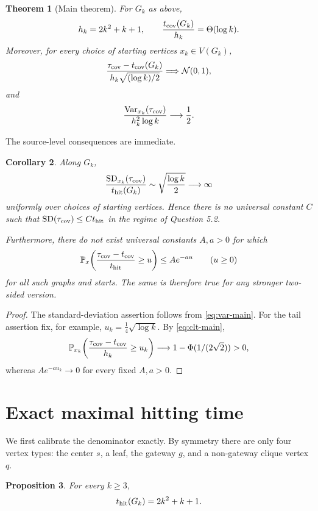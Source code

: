 \documentclass[11pt]{article}
\newtheorem{theorem}{Theorem}
\newtheorem{proposition}[theorem]{Proposition}
\newtheorem{corollary}[theorem]{Corollary}
\newcommand{\Pp}{\mathbb P}
\newcommand{\Var}{\operatorname{Var}}
\newcommand{\N}{\mathcal N}
\begin{document}
\begin{theorem}[Main theorem]\label{thm:main}
For $G_k$ as above,
\[
 h_k=2k^2+k+1,
 \qquad
 \frac{t_{\rm cov}(G_k)}{h_k}=\Theta(\log k).
\]
Moreover, for every choice of starting vertices $x_k\in V(G_k)$,
\begin{equation}\label{eq:clt-main}
 \frac{\tau_{\rm cov}-t_{\rm cov}(G_k)}
 {h_k\sqrt{(\log k)/2}}
 \Longrightarrow \N(0,1),
\end{equation}
and
\begin{equation}\label{eq:var-main}
 \frac{\Var_{x_k}(\tau_{\rm cov})}{h_k^2\log k}
 \longrightarrow \frac12.
\end{equation}
\end{theorem}

The source-level consequences are immediate.

\begin{corollary}\label{cor:refute}
Along $G_k$,
\[
 \frac{\operatorname{SD}_{x_k}(\tau_{\rm cov})}{t_{\rm hit}(G_k)}
 \sim \sqrt{\frac{\log k}{2}}\longrightarrow\infty
\]
uniformly over choices of starting vertices.  Hence there is no universal
constant $C$ such that
$\operatorname{SD}(\tau_{\rm cov})\le C t_{\rm hit}$ in the regime of
Question 5.2.

Furthermore, there do not exist universal constants $A,a>0$ for which
\[
 \Pp_x\!\left(\frac{\tau_{\rm cov}-t_{\rm cov}}{t_{\rm hit}}\ge u\right)
 \le A e^{-au}
 \qquad (u\ge0)
\]
for all such graphs and starts.  The same is therefore true for any stronger
two-sided version.
\end{corollary}

\begin{proof}
The standard-deviation assertion follows from \eqref{eq:var-main}.  For the
tail assertion fix, for example, $u_k=\frac14\sqrt{\log k}$.  By
\eqref{eq:clt-main},
\[
 \Pp_{x_k}\!\left(
 \frac{\tau_{\rm cov}-t_{\rm cov}}{h_k}\ge u_k
 \right)
 \longrightarrow 1-\Phi(1/(2\sqrt2))>0,
\]
whereas $Ae^{-a u_k}\to0$ for every fixed $A,a>0$.
\end{proof}

\section{Exact maximal hitting time}

We first calibrate the denominator exactly.  By symmetry there are only four
vertex types: the center $s$, a leaf, the gateway $g$, and a non-gateway clique
vertex $q$.

\begin{proposition}\label{prop:hit}
For every $k\ge3$,
\[
 t_{\rm hit}(G_k)=2k^2+k+1.
\]
\end{proposition}
\end{document}
